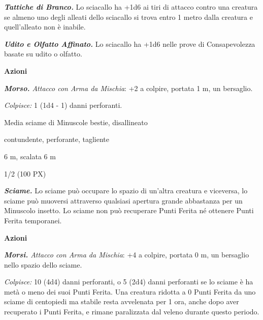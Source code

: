 \begin{multicols}{2}
{\emph{\textbf{Tattiche di Branco.}} Lo sciacallo ha +1d6 ai tiri di attacco contro una creatura se almeno uno degli alleati dello sciacallo si trova entro 1 metro dalla creatura e quell'alleato non è inabile.

\emph{\textbf{Udito e Olfatto Affinato.}} Lo sciacallo ha +1d6 nelle prove di Consapevolezza basate su udito o olfatto.

\textbf{Azioni}

\emph{\textbf{Morso.} Attacco con Arma da Mischia}: +2 a colpire, portata 1 m, un bersaglio.

\emph{Colpisce:} 1 (1d4 - 1) danni perforanti.

\begin{description}[noitemsep, topsep=0pt, parsep=0pt, partopsep=0pt, itemsep=1pt, leftmargin=2.35cm,  labelwidth=2.2cm, itemindent=0cm, listparindent=0pt] %
\setlength{\baselineskip}{10pt}
\item[\textbf{Taglia/Tipo}] Media sciame di Minuscole bestie, disallineato
\item[\textbf{Caratt.}] 
\item[\textbf{Punti Ferita}] 
\item[\textbf{Resistenze al danno}] contundente, perforante, tagliente
\item[\textbf{Tiri Salvez.}] 
\item[\textbf{Movimento}] 6 m, scalata 6 m
\item[\textbf{Sfida}] 1/2 (100 PX)
\end{description}
\smallskip

\emph{\textbf{Sciame.}} Lo sciame può occupare lo spazio di un'altra creatura e viceversa, lo sciame può muoversi attraverso qualsiasi apertura grande abbastanza per un Minuscolo insetto. Lo sciame non può recuperare Punti Ferita né ottenere Punti Ferita temporanei.

\textbf{Azioni}

\emph{\textbf{Morsi.} Attacco con Arma da Mischia}: +4 a colpire, portata 0 m, un bersaglio nello spazio dello sciame.

\emph{Colpisce:} 10 (4d4) danni perforanti, o 5 (2d4) danni perforanti se lo sciame è ha metà o meno dei suoi Punti Ferita. Una creatura ridotta a 0 Punti Ferita da uno sciame di centopiedi ma stabile resta avvelenata per 1 ora, anche dopo aver recuperato i Punti Ferita, e rimane paralizzata dal veleno durante questo periodo.

}
\end{multicols}
